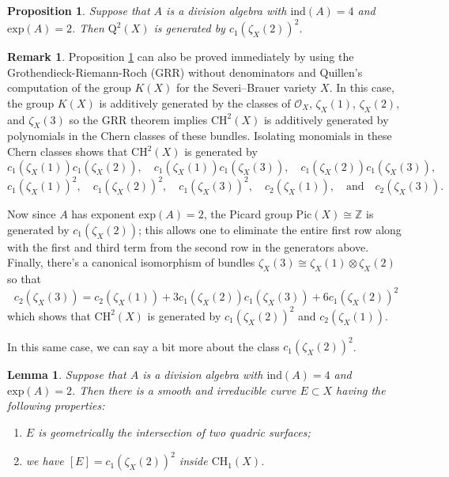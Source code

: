 \documentclass[12pt]{amsart}
\newtheorem{prop}[thm]{Proposition}
\newtheorem{lem}[thm]{Lemma}
\theoremstyle{definition}
\newtheorem{rmk}[thm]{Remark}
\newcounter{item}
\newcommand{\CH}{\mathrm{CH}}
\newcommand{\Q}{\mathrm{Q}}
\begin{document}
\begin{prop}\label{prop: gen}
Suppose that $A$ is a division algebra with $\mathrm{ind}(A)=4$ and $\mathrm{exp}(A)=2$. Then $\Q^2(X)$ is generated by $c_1(\zeta_X(2))^2$.
\end{prop}

\begin{rmk}
Proposition \ref{prop: gen} can also be proved immediately by using the Grothendieck-Riemann-Roch (GRR) without denominators \cite[Example 15.3.6]{MR1644323} and Quillen's computation \cite[Theorem 4.1]{MR0338129} of the group $K(X)$ for the Severi--Brauer variety $X$. In this case, the group $K(X)$ is additively generated by the classes of $\mathcal{O}_X$, $\zeta_X(1)$, $\zeta_X(2)$, and $\zeta_X(3)$ so the GRR theorem implies $\CH^2(X)$ is additively generated by polynomials in the Chern classes of these bundles. Isolating monomials in these Chern classes shows that $\CH^2(X)$ is generated by 
\[c_1(\zeta_X(1))c_1(\zeta_X(2)), \quad c_1(\zeta_X(1))c_1(\zeta_X(3)), \quad c_1(\zeta_X(2))c_1(\zeta_X(3)),\]
\[ c_1(\zeta_X(1))^2,\quad c_1(\zeta_X(2))^2,\quad c_1(\zeta_X(3))^2, \quad c_2(\zeta_X(1)),\quad \mbox{and}\quad c_2(\zeta_X(3)).\]

Now since $A$ has exponent $\mathrm{exp}(A)=2$, the Picard group $\mathrm{Pic}(X)\cong \mathbb{Z}$ is generated by $c_1(\zeta_X(2))$; this allows one to eliminate the entire first row along with the first and third term from the second row in the generators above. Finally, there's a canonical isomorphism of bundles $\zeta_X(3)\cong \zeta_X(1)\otimes \zeta_X(2)$ so that \[c_2(\zeta_X(3))=c_2(\zeta_X(1))+3c_1(\zeta_X(2))c_1(\zeta_X(3))+6c_1(\zeta_X(2))^2\] which shows that $\CH^2(X)$ is generated by $c_1(\zeta_X(2))^2$ and $c_2(\zeta_X(1))$.
\end{rmk}

In this same case, we can say a bit more about the class $c_1(\zeta_X(2))^2$.

\begin{lem}\label{lem: ell}
Suppose that $A$ is a division algebra with $\mathrm{ind}(A)=4$ and $\mathrm{exp}(A)=2$. Then there is a smooth and irreducible curve $E\subset X$ having the following properties:
\begin{enumerate}
\item $E$ is geometrically the intersection of two quadric surfaces;
\item we have $[E]=c_1(\zeta_X(2))^2$ inside $\CH_1(X)$.
\end{enumerate}
\end{lem}
\end{document}
